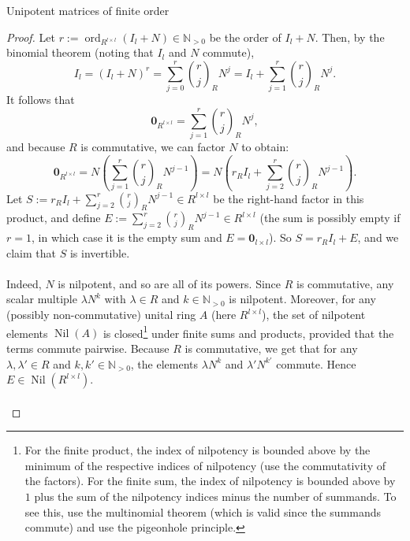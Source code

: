 \begin{appendixitem}{Unipotent matrices of finite order}
    \begin{proof}
        Let \( r := \operatorname{ord}_{R^{l\times l}}\left(I_{l} + N\right) \in \mathbb{N}_{>0} \) be the order of \( I_{l} + N \). Then, by the binomial theorem (noting that \( I_{l} \) and \( N \) commute),
        \[
            I_l = \left(I_l + N\right)^r = \sum_{j=0}^{r} \binom{r}{j}_{R} N^{j} = I_l + \sum_{j=1}^{r} \binom{r}{j}_{R} N^{j}.
        \]
        It follows that
        \[
            \mathbf{0}_{R^{l\times l}} = \sum_{j=1}^{r} \binom{r}{j}_{R} N^{j},
        \]
        and because \( R \) is commutative, we can factor \( N \) to obtain:
        \[
            \mathbf{0}_{R^{l\times l}} = N \left( \sum_{j=1}^{r} \binom{r}{j}_{R} N^{j-1} \right) = N \left( r_{R} I_{l} + \sum_{j=2}^{r} \binom{r}{j}_{R} N^{j-1} \right).
        \]
        Let \( S := r_{R} I_{l} + \sum_{j=2}^{r} \binom{r}{j}_{R} N^{j-1} \in R^{l\times l} \) be the right-hand factor in this product, and define \( E := \sum_{j=2}^{r} \binom{r}{j}_{R} N^{j-1} \in R^{l\times l} \) (the sum is possibly empty if \( r = 1 \), in which case it is the empty sum and \( E = \mathbf{0}_{l\times l} \)). So \( S = r_{R} I_l + E \), and we claim that \( S \) is invertible.
        \\\\
        Indeed, \( N \) is nilpotent, and so are all of its powers. Since \( R \) is commutative, any scalar multiple \( \lambda N^k \) with \( \lambda \in R \) and \( k \in \mathbb{N}_{>0} \) is nilpotent. Moreover, for any (possibly non-commutative) unital ring \( A \) (here \( R^{l \times l} \)), the set of nilpotent elements \( \operatorname{Nil}\left( A \right) \) is closed\footnote{For the finite product, the index of nilpotency is bounded above by the minimum of the respective indices of nilpotency (use the commutativity of the factors). For the finite sum, the index of nilpotency is bounded above by \( 1 \) plus the sum of the nilpotency indices minus the number of summands. To see this, use the multinomial theorem (which is valid since the summands commute) and use the pigeonhole principle.} under finite sums and products, provided that the terms commute pairwise. Because \( R \) is commutative, we get that for any \( \lambda, \lambda' \in R \) and \( k, k' \in \mathbb{N}_{>0} \), the elements \( \lambda N^k \) and \( \lambda' N^{k'} \) commute. Hence \( E \in \operatorname{Nil}\left(R^{l\times l}\right) \).
        \\\\

\end{proof}
\end{appendixitem}
